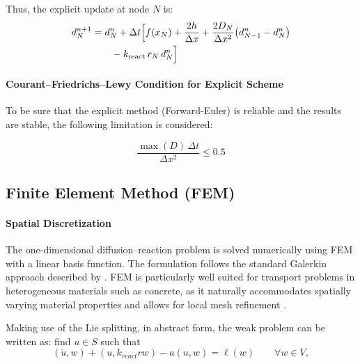 \documentclass[conference]{IEEEtran}
\begin{document}
Thus, the explicit update at node $N$ is:
\begin{equation}
\begin{aligned}
d_N^{n+1}
&=
d_N^n
+
\Delta t
\Bigl[
f(x_N)
+
\frac{2h}{\Delta x}
+
\frac{2D_N}{\Delta x^2}
\bigl(d_{N-1}^n - d_N^n\bigr)
\\
&\qquad
-
k_{\mathrm{react}}\, r_N\, d_N^n
\Bigr]
\end{aligned}
\label{eq:forward_euler_boundary}
\end{equation}


\paragraph{Courant--Friedrichs--Lewy Condition for Explicit Scheme}\mbox{} To be sure that the explicit method (Forward-Euler) is reliable and the results  are stable, the following limitation is considered:

\begin{equation}
\frac{\max(D) \, \Delta t}{\Delta x^2} \le 0.5 
\label{eq:cfl}
\end{equation}



\subsection{Finite Element Method (FEM)}\label{AA}

\paragraph{Spatial Discretization}

The one-dimensional diffusion--reaction problem is solved numerically using FEM with a linear basis function. The formulation follows the standard Galerkin approach described by \cite{b15}. FEM is particularly well suited for transport problems in heterogeneous materials such as concrete, as it naturally accommodates spatially varying material properties and allows for local mesh refinement \cite{b15}.

Making use of the Lie splitting, in abstract form, the weak problem can be written as: find $u \in S$ such that
\begin{equation}
(\dot{u},w) + (u, k_{react} r w)-a(u,w) = \ell(w)
\qquad \forall w \in V ,
\end{equation}
\end{document}
